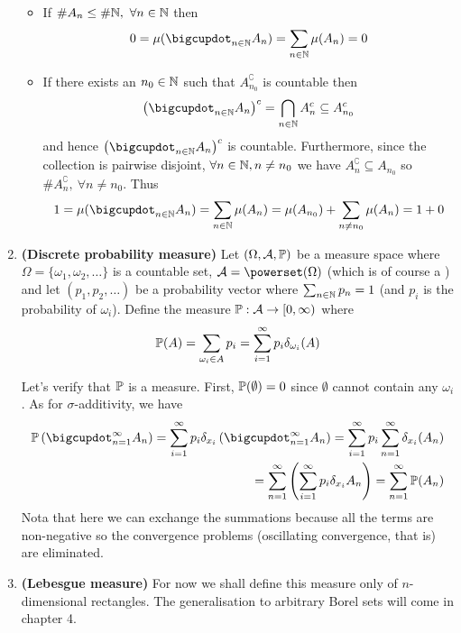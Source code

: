 \begin{eg}
\begin{enumerate}
	\begin{itemize}
		\item If $\#A_n \leq \#\mathbb{N},\ \forall n \in \mathbb{N}$ then
		\begin{align*}
			0 = \mu(\bigcupdot_{n \in \N} A_n) = \sum_{n\in \N} \mu(A_n) = 0
		\end{align*} 
		\item If there exists an $n_0 \in \mathbb{N}$ such that $A_{n_0}^\complement$ is countable then
		\begin{align*}
			\left(\bigcupdot_{n \in \N} A_n\right)^\complement = \bigcap_{n \in \N} A_n^\complement \subseteq A_{n_0}^\complement
		\end{align*}
		and hence $\left(\bigcupdot_{n \in \N} A_n\right)^\complement$ is countable. Furthermore, since the collection is pairwise disjoint, $\forall n \in \mathbb{N}, n \neq n_0$ we have $A_n^\complement \subseteq A_{n_0}$ so $\#A_n^\complement,\ \forall n \neq n_0$. Thus
		\begin{align*}
			1 = \mu(\bigcupdot_{n \in \N} A_n) = \sum_{n\in\N} \mu(A_n) = \mu(A_{n_0}) + \sum_{n \neq n_0} \mu(A_n) = 1 + 0
		\end{align*}
	\end{itemize}
	\item \textbf{(Discrete probability measure)} Let $(\Omega, \mathcal{A}, \mathbb{P})$ be a measure space where $\Omega = \{\omega_1, \omega_2, \dots \}$ is a countable set, $\sa = \powerset(\Omega)$ (which is of course a \siga) and let $(p_1, p_2, \dots)$ be a probability vector where $\sum_{n\in \mathbb{N}} p_n = 1$ (and $p_i$ is the probability of $\omega_i$). Define the measure $\mathbb{P} : \mathcal{A} \to [0, \infty)$ where
	\begin{align*}
		\mathbb{P}(A) = \sum_{\omega_i \in A} p_i = \sum_{i=1}^\infty p_i \delta_{\omega_i}(A)
	\end{align*}
	
	Let's verify that $\mathbb{P}$ is a measure. First, $\mathbb{P}(\emptyset) = 0$ since $\emptyset$ cannot contain any $\omega_i$. As for $\sigma$-additivity, we have
	\begin{align*}
		\Pro\left(\bigcupdot_{n = 1}^\infty A_n\right) = \sum_{i=1}^\infty p_i \delta_{x_i}\left(\bigcupdot_{n = 1}^\infty A_n\right) = \sum_{i = 1}^\infty p_i \sum_{n = 1}^\infty \delta_{x_i}(A_n) \\
		= \sum_{n = 1}^\infty \left(\sum_{i = 1}^\infty p_i\delta_{x_i} A_n\right) = \sum_{n = 1}^\infty \Pro(A_n)
	\end{align*}
	Nota that here we can exchange the summations because all the terms are non-negative so the convergence problems (oscillating convergence, that is) are eliminated.
	\item \textbf{(Lebesgue measure)} For now we shall define this measure only of $n$-dimensional rectangles. The generalisation to arbitrary Borel sets will come in chapter 4.
	

\end{enumerate}
\end{eg}
